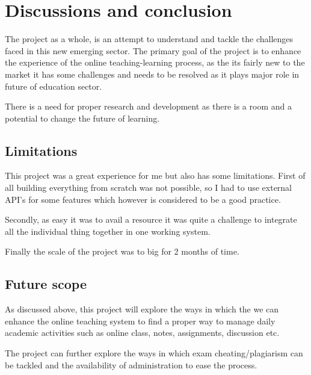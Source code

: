 \chapter{Discussions and conclusion}

The project as a whole, is an attempt to understand and tackle the challenges faced in this new emerging sector. The primary goal of the project is to enhance the experience of the online teaching-learning process, as the its fairly new to the market it has some challenges and needs to be resolved as it plays major role in future of education sector.

There is a need for proper research and development as there is a room and a potential to change the future of learning.

\textbf{}
\textbf{}
\section{Limitations}
This project was a great experience for me but also has some limitations. First of all building everything from scratch was not possible, so I had to use external API's for some features which however is considered to be a good practice.

Secondly, as easy it was to avail a resource it was quite a challenge to integrate all the individual thing together in one working system.

Finally the scale of the project was to big for 2 months of time.

\textbf{}
\textbf{}






\section{Future scope}

As discussed above, this project will explore the ways in which the we can enhance the online teaching system to find a proper way to manage daily academic activities such as online class, notes, assignments, discussion etc. 

The project can further explore the ways in which exam cheating/plagiarism can be tackled and the availability of administration to ease the process.  
